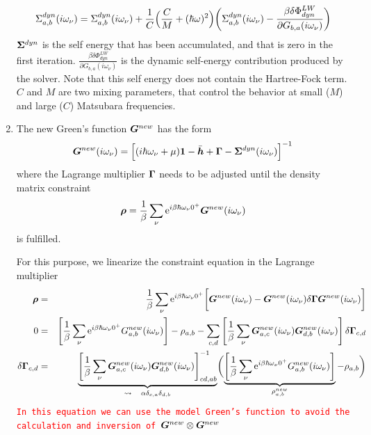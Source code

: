 \documentclass[11pt,a4paper]{report}
\newcommand{\petertt}[1]{\textcolor{red}{\texttt{#1}}}
\begin{document}
\begin{enumerate}
  \begin{eqnarray}
    \Sigma^{dyn}_{a,b}(i\omega_\nu)
=\Sigma^{dyn}_{a,b}(i\omega_\nu)
+\frac{1}{C}\Bigl(\frac{C}{M}+(\hbar\omega)^2\Bigr)
\biggl(\Sigma^{dyn}_{a,b}(i\omega_\nu)
-\frac{\beta\delta\Phi^{LW}_{dyn}}{\partial G_{b,a}(i\omega_\nu)}
\biggr)
\end{eqnarray}
$\bm{\Sigma}^{dyn}$ is the self energy that has been accumulated, and
  that is zero in the first
  iteration. $\frac{\beta\delta\Phi^{LW}_{dyn}} {\partial
    G_{b,a}(i\omega_\nu)}$ is the dynamic self-energy contribution
  produced by the solver. Note that this self energy does not contain
  the Hartree-Fock term. $C$ and $M$ are two mixing parameters, that
  control the behavior at small ($M$) and large ($C$) Matsubara
  frequencies.
%
\item The new Green's function $\bm{G}^{new}$ has the form
\begin{eqnarray}
\bm{G}^{new}(i\omega_\nu)=\Bigl[(i\hbar\omega_\nu+\mu)\bm{1}
-\bar{\bm{h}}+\bm{\Gamma}
-\bm{\Sigma}^{dyn}(i\omega_\nu)
\Bigr]^{-1}
\end{eqnarray}
where the Lagrange multiplier $\bm{\Gamma}$ needs to be adjusted until
the density matrix constraint
\begin{eqnarray}
\bm{\rho}=\frac{1}{\beta}\sum_\nu 
\mathrm{e}^{i\beta\hbar\omega_\nu0^+}\bm{G}^{new}(i\omega_\nu)
\end{eqnarray}
is fulfilled. 

For this purpose, we linearize the constraint equation in the Lagrange
multiplier
\begin{eqnarray}
\bm{\rho}&=&\frac{1}{\beta}\sum_\nu 
\mathrm{e}^{i\beta\hbar\omega_\nu0^+}
\biggl[
\bm{G}^{new}(i\omega_\nu)-\bm{G}^{new}(i\omega_\nu)\delta\bm{\Gamma}
\bm{G}^{new}(i\omega_\nu)\biggr]
\nonumber\\
0&=&\left[\frac{1}{\beta}\sum_\nu \mathrm{e}^{i\beta\hbar\omega_\nu0^+}
G^{new}_{a,b}(i\omega_\nu)\right]-\rho_{a,b}
-\sum_{c,d}\left[
\frac{1}{\beta}\sum_\nu 
\bm{G}^{new}_{a,c}(i\omega_\nu)\bm{G}^{new}_{d,b}(i\omega_\nu)\right]
\delta\bm{\Gamma}_{c,d}
\nonumber\\
\delta\bm{\Gamma}_{c,d}
&=&
\underbrace{
\left[
\frac{1}{\beta}\sum_\nu 
\bm{G}^{new}_{a,c}(i\omega_\nu)\bm{G}^{new}_{d,b}(i\omega_\nu)
\right]^{-1}_{cd,ab}
}_{\leadsto\quad \alpha\delta_{c,a}\delta_{d,b}}
\biggl(
\underbrace{\left[\frac{1}{\beta}\sum_\nu \mathrm{e}^{i\beta\hbar\omega_\nu0^+}
G^{new}_{a,b}(i\omega_\nu)\right]}_{\rho^{new}_{a,b}}-\rho_{a,b}
\biggr)
\end{eqnarray}
\petertt{In this equation we can use the model Green's function to
  avoid the calculation and inversion of
  $\bm{G}^{new}\otimes\bm{G}^{new}$}


\end{enumerate}
\end{document}
